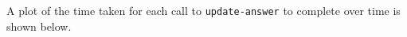 \documentclass[12pt,twoside,notitlepage,xetex]{report}
\begin{document}
A plot of the time taken for each call to \verb¬update-answer¬ to complete over time is shown below.

\newpage
\begin{landscape}
\begin{center}
\begin{figure}[H]
\begin{center}
\end{center}
\end{figure}
\end{center}
\end{landscape}
\end{document}
